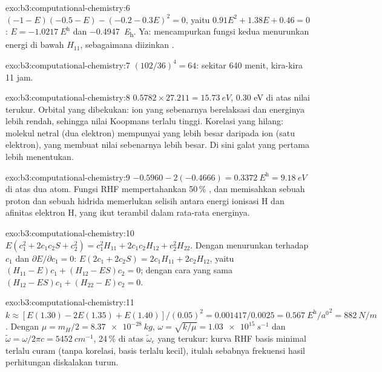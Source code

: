 \begin{solution}{exo:b3:computational-chemistry:6}
$(-1 - E)(-0.5 - E) - (-0.2 - 0.3E)^2 = 0$, yaitu $0.91E^2 + 1.38E + 0.46 = 0$:
$E = \qty{-1.0217}{\hartree}$ dan \qty{-0.4947}{\hartree}. Ya: mencampurkan
fungsi kedua menurunkan energi di bawah $H_{11}$, sebagaimana diizinkan .
\end{solution}

\begin{solution}{exo:b3:computational-chemistry:7}
$(102/36)^4 = 64$: sekitar 640 menit, kira-kira 11 jam.
\end{solution}

\begin{solution}{exo:b3:computational-chemistry:8}
$0.5782 \times 27.211 = \qty{15.73}{eV}$, 0.30 eV di atas nilai terukur.
Orbital yang dibekukan: ion yang sebenarnya berelaksasi dan energinya lebih
rendah, sehingga nilai Koopmans terlalu tinggi. Korelasi yang hilang: molekul
netral (dua elektron) mempunyai  yang lebih besar daripada ion
(satu elektron), yang membuat nilai sebenarnya lebih besar. Di sini galat
yang pertama lebih menentukan.
\end{solution}

\begin{solution}{exo:b3:computational-chemistry:9}
$-0.5960 - 2(-0.4666) = \qty{0.3372}{\hartree} = \qty{9.18}{eV}$ di atas dua atom.
Fungsi RHF mempertahankan 50\,\% , dan memisahkan sebuah proton dan
sebuah hidrida memerlukan selisih antara energi ionisasi H dan afinitas
elektron H, yang ikut terambil dalam rata-rata energinya.
\end{solution}

\begin{solution}{exo:b3:computational-chemistry:10}
$E(c_1^2 + 2c_1c_2S + c_2^2) = c_1^2H_{11} + 2c_1c_2H_{12} + c_2^2H_{22}$.
Dengan menurunkan terhadap $c_1$ dan $\partial E/\partial c_1 = 0$:
$E(2c_1 + 2c_2S) = 2c_1H_{11} + 2c_2H_{12}$, yaitu $(H_{11} - E)c_1 + (H_{12} -
ES)c_2 = 0$; dengan cara yang sama $(H_{12} - ES)c_1 + (H_{22} - E)c_2 = 0$.
\end{solution}

\begin{solution}{exo:b3:computational-chemistry:11}
$k \approx [E(1.30) - 2E(1.35) + E(1.40)]/(0.05)^2 = 0.001417/0.0025 =
\qty{0.567}{\hartree\per\bohr\squared} = \qty{882}{N/m}$. Dengan $\mu = m_H/2 =
\qty{8.37e-28}{kg}$, $\omega = \sqrt{k/\mu} = \qty{1.03e15}{s^{-1}}$ dan
$\tilde\omega = \omega/2\pi c = \qty{5452}{cm^{-1}}$, 24\,\% di atas
$\tilde\omega_e$ yang terukur: kurva RHF basis minimal terlalu curam (tanpa
korelasi, basis terlalu kecil), itulah sebabnya frekuensi hasil perhitungan
diskalakan turun.
\end{solution}

